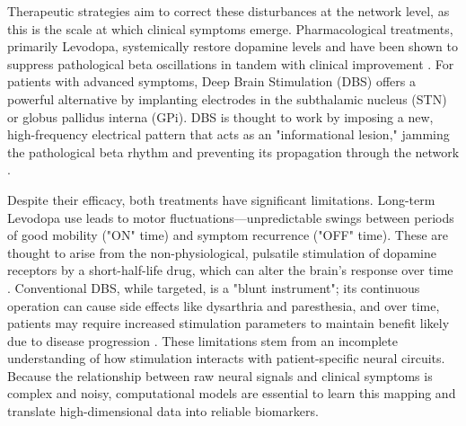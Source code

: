 \documentclass[12pt, a4paper]{article}
\begin{document}
Therapeutic strategies aim to correct these disturbances at the network level, as this is the scale at which clinical symptoms emerge. Pharmacological treatments, primarily Levodopa, systemically restore dopamine levels and have been shown to suppress pathological beta oscillations in tandem with clinical improvement \parencite{paulsCorticalBetaBurst2022}. For patients with advanced symptoms, Deep Brain Stimulation (DBS) offers a powerful alternative by implanting electrodes in the subthalamic nucleus (STN) or globus pallidus interna (GPi). DBS is thought to work by imposing a new, high-frequency electrical pattern that acts as an "informational lesion," jamming the pathological beta rhythm and preventing its propagation through the network \parencite{chikenMechanismDeepBrain2016,mcintyreNetworkPerspectivesMechanisms2010}.

Despite their efficacy, both treatments have significant limitations. Long-term Levodopa use leads to motor fluctuations—unpredictable swings between periods of good mobility ("ON" time) and symptom recurrence ("OFF" time). These are thought to arise from the non-physiological, pulsatile stimulation of dopamine receptors by a short-half-life drug, which can alter the brain's response over time \parencite{obesoBasalGangliaParkinsons2009}. Conventional DBS, while targeted, is a "blunt instrument"; its continuous operation can cause side effects like dysarthria and paresthesia, and over time, patients may require increased stimulation parameters to maintain benefit likely due to disease progression \parencite{krackFiveYearFollowupBilateral2003}. These limitations stem from an incomplete understanding of how stimulation interacts with patient-specific neural circuits. Because the relationship between raw neural signals and clinical symptoms is complex and noisy, computational models are essential to learn this mapping and translate high-dimensional data into reliable biomarkers.
\end{document}
